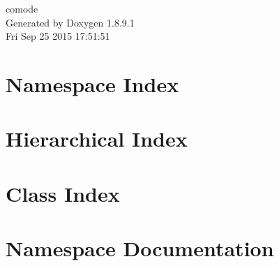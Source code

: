 \documentclass[twoside]{book}
\newcommand{\+}{\discretionary{\mbox{\scriptsize$\hookleftarrow$}}{}{}}
\newcommand{\clearemptydoublepage}{%
  \newpage{\pagestyle{empty}\cleardoublepage}%
}
\begin{document}
\hypersetup{pageanchor=false,
             bookmarks=true,
             bookmarksnumbered=true,
             pdfencoding=unicode
            }
\begin{titlepage}
\vspace*{7cm}
\begin{center}%
{\Large comode }\\
\vspace*{1cm}
{\large Generated by Doxygen 1.8.9.1}\\
\vspace*{0.5cm}
{\small Fri Sep 25 2015 17:51:51}\\
\end{center}
\end{titlepage}
\clearemptydoublepage
\tableofcontents
\clearemptydoublepage
{}
\hypersetup{pageanchor=true}

\chapter{Namespace Index}

\chapter{Hierarchical Index}

\chapter{Class Index}

\chapter{Namespace Documentation}

\end{document}
